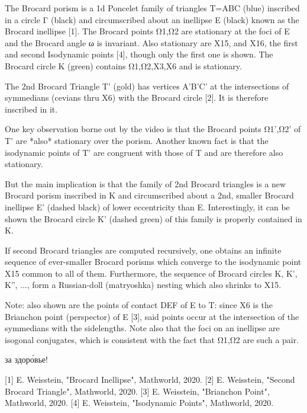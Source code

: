 The Brocard porism is a 1d Poncelet family of triangles T=ABC (blue) inscribed in a circle Γ (black) and circumscribed about an inellipse E (black) known as the Brocard inellipse [1]. The Brocard points Ω1,Ω2 are stationary at the foci of E and the Brocard angle ω is invariant. Also stationary are X15, and X16, the first and second Isodynamic points [4], though only the first one is shown. The Brocard circle K (green) contains Ω1,Ω2,X3,X6 and is stationary.

The 2nd Brocard Triangle T' (gold) has vertices A'B'C' at the intersections of symmedians (cevians thru X6) with the Brocard circle [2]. It is therefore inscribed in it.

One key observation borne out by the video is that the Brocard points  Ω1',Ω2' of T' are *also* stationary over the porism. Another known fact is that the isodynamic points of T' are congruent with those of T and are therefore also stationary.

But the main implication is that the family of 2nd Brocard triangles is a new Brocard porism inscribed in K and circumscribed about a 2nd, smaller Brocard inellipse E' (dashed black) of lower eccentricity than E. Interestingly, it can be shown the Brocard circle K' (dashed green) of this family is properly contained in K. 

If second Brocard triangles are computed recursively,  one obtains an infinite sequence of ever-smaller Brocard porisms which converge to the isodynamic point X15 common to all of them. Furthermore,  the sequence of Brocard circles K, K', K'', ..., form a Russian-doll (matryoshka) nesting which also shrinks to X15.

Note: also shown are the points of contact DEF of E to T: since X6 is the Brianchon point (perspector) of E [3], said points occur at the intersection of the symmedians with the sidelengths. Note also that the foci on an inellipse are isogonal conjugates, which is consistent with the fact that Ω1,Ω2 are such a pair. 

за здоро́вье!

[1] E. Weisstein, "Brocard Inellipse", Mathworld, 2020. 
[2] E. Weisstein, "Second Brocard Triangle", Mathworld, 2020. 
[3] E. Weisstein, "Brianchon Point", Mathworld, 2020. 
[4] E. Weisstein, "Isodynamic Points", Mathworld, 2020.